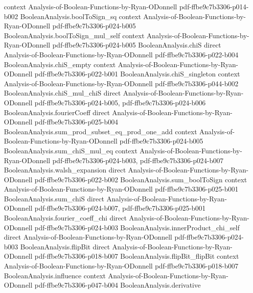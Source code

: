 \begin{theorem}
  {context}
  {Analysis-of-Boolean-Functions-by-Ryan-ODonnell}
  {pdf-ffbe9c7b3306-p014-b002}
\proofstep
  {BooleanAnalysis.boolToSign_sq}
  {context}
  {Analysis-of-Boolean-Functions-by-Ryan-ODonnell}
  {pdf-ffbe9c7b3306-p024-b005}
\proofstep
  {BooleanAnalysis.boolToSign_mul_self}
  {context}
  {Analysis-of-Boolean-Functions-by-Ryan-ODonnell}
  {pdf-ffbe9c7b3306-p024-b005}
\proofstep
  {BooleanAnalysis.chiS}
  {direct}
  {Analysis-of-Boolean-Functions-by-Ryan-ODonnell}
  {pdf-ffbe9c7b3306-p022-b004}
\proofstep
  {BooleanAnalysis.chiS_empty}
  {context}
  {Analysis-of-Boolean-Functions-by-Ryan-ODonnell}
  {pdf-ffbe9c7b3306-p022-b001}
\proofstep
  {BooleanAnalysis.chiS_singleton}
  {context}
  {Analysis-of-Boolean-Functions-by-Ryan-ODonnell}
  {pdf-ffbe9c7b3306-p044-b002}
\proofstep
  {BooleanAnalysis.chiS_mul_chiS}
  {direct}
  {Analysis-of-Boolean-Functions-by-Ryan-ODonnell}
  {pdf-ffbe9c7b3306-p024-b005,
    pdf-ffbe9c7b3306-p024-b006}
\proofstep
  {BooleanAnalysis.fourierCoeff}
  {direct}
  {Analysis-of-Boolean-Functions-by-Ryan-ODonnell}
  {pdf-ffbe9c7b3306-p025-b004}
\proofstep
  {BooleanAnalysis.sum_prod_subset_eq_prod_one_add}
  {context}
  {Analysis-of-Boolean-Functions-by-Ryan-ODonnell}
  {pdf-ffbe9c7b3306-p024-b005}
\proofstep
  {BooleanAnalysis.sum_chiS_mul_eq}
  {context}
  {Analysis-of-Boolean-Functions-by-Ryan-ODonnell}
  {pdf-ffbe9c7b3306-p024-b003,
    pdf-ffbe9c7b3306-p024-b007}
\proofstep
  {BooleanAnalysis.walsh_expansion}
  {direct}
  {Analysis-of-Boolean-Functions-by-Ryan-ODonnell}
  {pdf-ffbe9c7b3306-p022-b002}
\proofstep
  {BooleanAnalysis.sum_boolToSign}
  {context}
  {Analysis-of-Boolean-Functions-by-Ryan-ODonnell}
  {pdf-ffbe9c7b3306-p025-b001}
\proofstep
  {BooleanAnalysis.sum_chiS}
  {direct}
  {Analysis-of-Boolean-Functions-by-Ryan-ODonnell}
  {pdf-ffbe9c7b3306-p024-b007,
    pdf-ffbe9c7b3306-p025-b001}
\proofstep
  {BooleanAnalysis.fourier_coeff_chi}
  {direct}
  {Analysis-of-Boolean-Functions-by-Ryan-ODonnell}
  {pdf-ffbe9c7b3306-p024-b003}
\proofstep
  {BooleanAnalysis.innerProduct_chi_self}
  {direct}
  {Analysis-of-Boolean-Functions-by-Ryan-ODonnell}
  {pdf-ffbe9c7b3306-p024-b003}
\proofstep
  {BooleanAnalysis.flipBit}
  {direct}
  {Analysis-of-Boolean-Functions-by-Ryan-ODonnell}
  {pdf-ffbe9c7b3306-p018-b007}
\proofstep
  {BooleanAnalysis.flipBit_flipBit}
  {context}
  {Analysis-of-Boolean-Functions-by-Ryan-ODonnell}
  {pdf-ffbe9c7b3306-p018-b007}
\proofstep
  {BooleanAnalysis.influence}
  {context}
  {Analysis-of-Boolean-Functions-by-Ryan-ODonnell}
  {pdf-ffbe9c7b3306-p047-b004}
\proofstep
  {BooleanAnalysis.derivative}

\end{theorem}
